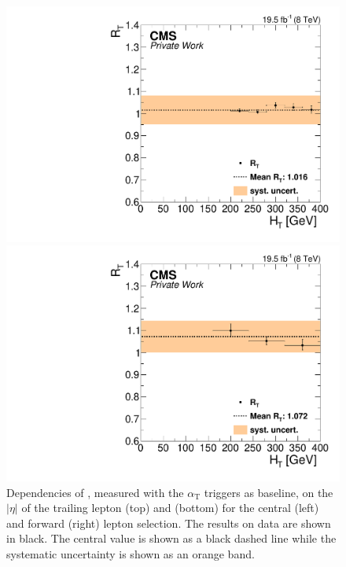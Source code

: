 \begin{figure}[htbp]
\begin{minipage}[t]{0.49\textwidth}
  \includegraphics[width=\textwidth]{plots/BG/trigger/Triggereff_SFvsOF_Syst_AlphaT_HighHTExclusiveCentral_Full2012_HT_None.pdf}
\end{minipage}
\begin{minipage}[t]{0.49\textwidth}
\includegraphics[width=\textwidth]{plots/BG/trigger/Triggereff_SFvsOF_Syst_AlphaT_HighHTExclusiveForward_Full2012_HT_None.pdf}
\end{minipage}
\caption{Dependencies of \RT, measured with the $\alpha_{\mathrm{T}}$ triggers as baseline, on the $|\eta|$ of the trailing lepton (top) and \HT (bottom) for the central (left) and forward (right) lepton selection. The results on data are shown in black. The central value is shown as a black dashed line while the systematic uncertainty is shown as an orange band.}
\label{fig:RTDependenciesApp2}
\end{figure}  

